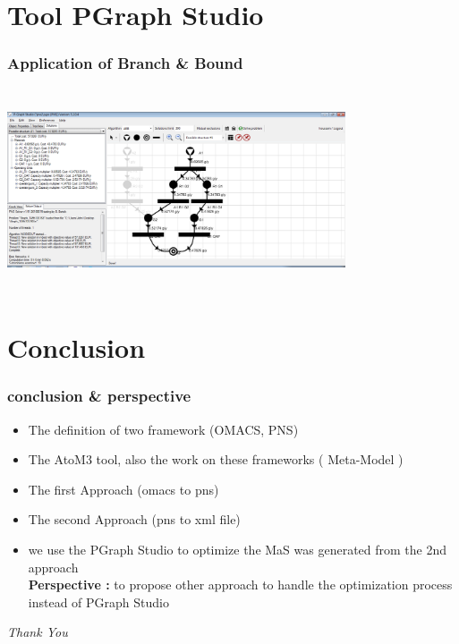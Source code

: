 \documentclass[12pt]{beamer}
\begin{document}
\begin{frame}
\begin{columns}
\end{columns}

\end{frame}


\section{Tool PGraph Studio}
\begin{frame}
\frametitle{Application of Branch \& Bound } 
	\begin{center}	
	\includegraphics[width=10cm,height=6cm]{optimal.png}
	\end{center}
\end{frame}

\section{Conclusion}
\begin{frame}
\frametitle{conclusion \& perspective} 
\begin{itemize}
\item The definition of two framework (OMACS, PNS)
\item The AtoM3 tool, also the work on these frameworks ( Meta-Model )

\item The first Approach (omacs to pns)
\item The second Approach (pns to xml file)
\item we use the PGraph Studio to optimize the MaS was generated from the 2nd approach \\ 
\textbf{Perspective :} to propose other approach to handle the optimization process instead of PGraph Studio
\end{itemize}
	
\end{frame}

\begin{frame}   
	\begin{center}	
	\emph{\Huge{Thank You}}
	
	\end{center}
\end{frame}
\end{document}
